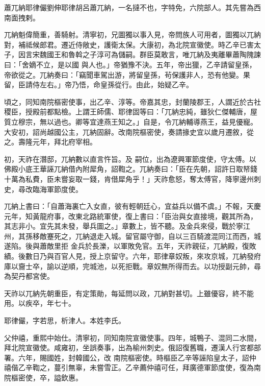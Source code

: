 
\begin{pinyinscope}

 蕭兀納耶律儼劉伸耶律胡呂蕭兀納，一名撻不也，字特免，六院部人。其先嘗為西南面拽剌。



 兀納魁偉簡重，善騎射。清寧初，兄圖獨以事入見，帝問族人可用者，圖獨以兀納對，補祗候郎君。遷近侍敞史，護衛太保。大康初，為北院宣徽使。時乙辛已害太子，因言宋魏國王和魯斡之子淳可為儲嗣。群臣莫敢言，唯兀納及夷離畢蕭陶隗諫曰：「舍嫡不立，是以國
 與人也。」帝猶豫不決。五年，帝出獵，乙辛請留皇孫，帝欲從之。兀納奏曰：「竊聞車駕出游，將留皇孫，茍保護非人，恐有他變。果留，臣請侍左右。」帝乃悟，命皇孫從行。由此，始疑乙辛。



 頃之，同知南院樞密使事，出乙辛、淳等。帝嘉其忠，封蘭陵郡王，人謂近於古社稷臣，授殿前都點檢。上謂王師儒、耶律固等曰：「兀納忠純，雖狄仁傑輔唐，屋質立穆宗，無以過也。卿等宜達燕王知之。」自是，令兀納輔導燕王，益見優寵。大安初，詔尚越國公主，兀納固辭。改南院樞密使，奏請掾史宜以歲月遷敘，從之。壽隆元年，拜北府宰相。



 初，天祚在潛邸，兀納數以直言忤旨。及
 嗣位，出為遼興軍節度使，守太傅。以佛殿小底王華誣兀納借內附犀角，詔鞫之。兀納奏曰：「臣在先朝，詔許日取帑錢十萬為私費，臣未嘗妄取一錢，肯借犀角乎！」天祚愈怒，奪太傅官，降寧邊州刺史，尋改臨海軍節度使。



 兀納上書曰：「自蕭海裏亡入女直，彼有輕朝廷心，宜益兵以備不虞。」不報，天慶元年，知黃龍府事，改東北路統軍使，復上書曰：「臣治與女直接境，觀其所為，其志非小。宜先其未發，舉兵圖之。」章數上，皆不聽。及金兵來侵，戰於寧江州，其孫移敵蹇死之，兀納退走入城。留官屬守御，自以三百騎渡混同江而西，城遂陷。後與蕭敵里拒
 金兵於長濼，以軍敗免官。五年，天祚親征，兀納殿，復敗績。後數日乃與百官人見，授上京留守。六年，耶律章奴叛，來攻京城，兀納發府庫以齎士卒，諭以逆順，完城池，以死拒戰。章奴無所得而去。以功授副元帥，尋為契丹都宮使。



 天祚以兀納先朝重臣，有定策勛，每延問以政，兀納對甚切。上雖優容，終不能用。以疾卒，年七十。



 耶律儼，字若思，析津人。本姓李氏。



 父仲禧，重熙中始仕。清寧初，同知南院宣徽使事。四年，城鴨子、混同二水間，拜北院宣徽使。咸雍初，坐誤奏事，出為榆州刺史。俄詔復舊職，遷漢人行宮都部署。六年，賜國姓，封韓國公，改
 南院樞密使。時樞臣乙辛等誣陷皇太子，詔仲禧偕乙辛鞫之，蔓引無辜，未嘗雪正。乙辛薦仲禧可任，拜廣德軍節度使，復為南院樞密使，卒，謚欽惠。




\end{pinyinscope}
